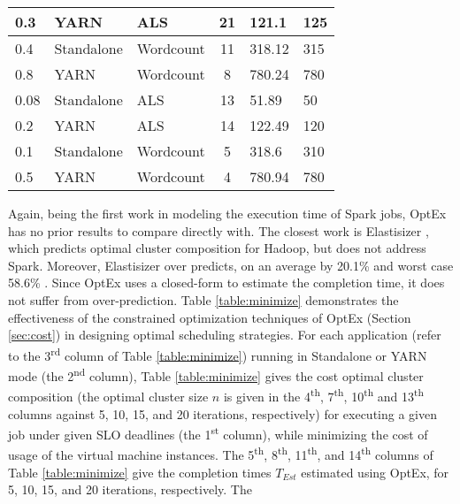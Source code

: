 \documentclass[conference]{IEEEtran}
\begin{document}
\begin{table}[!ht]
{\begin{tabular}{|l|l|l|c|l|l|}
0.3    & YARN       & ALS                        & 21  & 121.1     & 125       \\ \hline
0.4    & Standalone & Wordcount                      & 11  & 318.12    & 315       \\ \hline
0.8    & YARN       & Wordcount                      & 8   & 780.24    & 780       \\ \hline
0.08   & Standalone & ALS                        & 13  & 51.89     & 50        \\ \hline
0.2    & YARN       & ALS                        & 14  & 122.49    & 120       \\ \hline
0.1    & Standalone & Wordcount                      & 5   & 318.6     & 310       \\ \hline
0.5    & YARN       & Wordcount                      & 4   & 780.94    &  780         \\ \hline
\end{tabular}
}
\label{table:minimize1}
\end{table}
Again, being the first work in modeling the execution time of Spark jobs, OptEx has no prior results to compare directly with.
  The closest work is Elastisizer \cite{Herodotou:2011:NOS:2038916.2038934}, which predicts optimal cluster composition for Hadoop, but does not address Spark.
   Moreover, Elastisizer over predicts, on an average by 20.1\% and worst case 58.6\% \cite{Herodotou:2011:NOS:2038916.2038934}. Since OptEx uses a closed-form to estimate the completion time, it does not suffer from over-prediction.
    Table \ref{table:minimize} demonstrates the effectiveness of the constrained optimization techniques of OptEx (Section \ref{sec:cost}) in designing optimal scheduling strategies.
For each application (refer to the 3\textsuperscript{rd} column of Table \ref{table:minimize}) running in Standalone or YARN mode (the
 2\textsuperscript{nd} column), Table  \ref{table:minimize} gives the cost optimal cluster composition
 (the optimal cluster size $n$ is given in the 4\textsuperscript{th}, 7\textsuperscript{th}, 10\textsuperscript{th} and
 13\textsuperscript{th} columns against 5, 10, 15, and 20 iterations, respectively) for executing a given job under given SLO deadlines (the 1\textsuperscript{st} column), while minimizing
  the cost of usage of the virtual machine instances. The 5\textsuperscript{th},  8\textsuperscript{th}, 11\textsuperscript{th}, and
 14\textsuperscript{th} columns of Table \ref{table:minimize}
  give the completion times $T_{Est}$ estimated using OptEx, for 5, 10, 15, and 20 iterations, respectively. The
\end{document}
